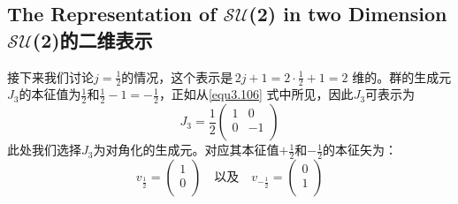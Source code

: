 \subsection[$\mathcal{SU}$(2)的二维表示]{The Representation of $\mathcal{SU}$(2) in two Dimension $\mathcal{SU}$(2)的二维表示}
\label{sec3.6.4}
接下来我们讨论$j=\frac{1}{2}$的情况，这个表示是$\,2j+1=2 \cdot \frac{1}{2}+1=2$ 维的。群的生成元$J_3$的本征值为$\frac{1}{2}$和$\frac{1}{2}-1=-\frac{1}{2}$，正如从\eqref{equ3.106} 式中所见，因此$J_3$可表示为
\begin{equation}\label{3.113}
  J_3=\frac{1}{2}\left(
                   \begin{array}{cc}
                     1 & 0 \\
                     0 & -1 \\
                   \end{array}
                 \right)
\end{equation}
此处我们选择$J_3$为对角化的生成元。对应其本征值$+\frac{1}{2}$和$-\frac{1}{2}$的本征矢为：
\begin{equation}\label{equ3.114}
  v_\frac{1}{2}=\left(
                  \begin{array}{c}
                    1 \\
                    0 \\
                  \end{array}
                \right)
                \quad \text{以及} \quad
     v_{-\frac{1}{2}}=\left(
                  \begin{array}{c}
                    0\\
                    1\\
                  \end{array}
                \right)
\end{equation}

